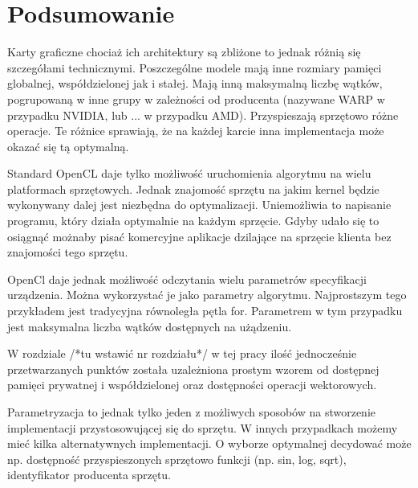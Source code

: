 
\section{Podsumowanie}

Karty graficzne chociaż ich architektury są zbliżone to jednak różnią się szczegółami technicznymi. Poszczególne modele mają inne rozmiary pamięci globalnej, współdzielonej jak i stałej.
Mają inną maksymalną liczbę wątków, pogrupowaną w inne grupy w zależności od producenta (nazywane WARP w przypadku NVIDIA, lub ... w przypadku AMD). Przyspieszają sprzętowo różne operacje. Te różnice sprawiają, że na każdej karcie inna implementacja może okazać się tą optymalną. \linebreak


Standard OpenCL daje tylko możliwość uruchomienia algorytmu na wielu platformach sprzętowych. Jednak znajomość sprzętu na jakim kernel będzie wykonywany dalej jest niezbędna do optymalizacji. 
Uniemożliwia to napisanie programu, który działa optymalnie na każdym sprzęcie. Gdyby udało się to osiągnąć możnaby pisać komercyjne aplikacje dzilające na sprzęcie klienta bez znajomości tego sprzętu. \linebreak




OpenCl daje jednak możliwość odczytania wielu parametrów specyfikacji urządzenia. Można wykorzystać je jako parametry algorytmu. Najprostszym tego przykładem jest tradycyjna równoległa pętla for. Parametrem w tym przypadku jest maksymalna liczba wątków dostępnych na użądzeniu.
\linebreak



W rozdziale /*tu wstawić nr rozdziału*/ w tej pracy ilość jednocześnie przetwarzanych punktów została uzależniona prostym wzorem od dostępnej pamięci prywatnej i współdzielonej oraz dostępności operacji wektorowych.
\linebreak

Parametryzacja to jednak tylko jeden z możliwych sposobów na stworzenie implementacji przystosowującej się do sprzętu. 
W innych przypadkach możemy mieć kilka alternatywnych implementacji. O wyborze optymalnej decydować może np. dostępność przyspieszonych sprzętowo funkcji (np. sin, log, sqrt), identyfikator producenta sprzętu.

